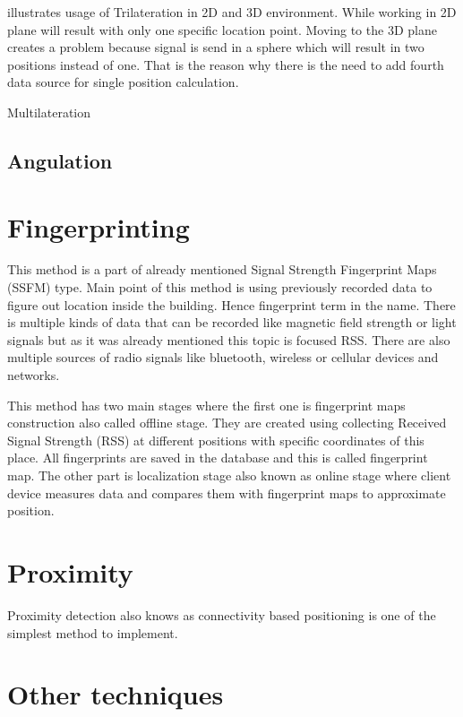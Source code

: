  illustrates usage of Trilateration in 2D and 3D environment. While working in 2D plane will result with only one specific location point. Moving to the 3D plane creates a problem because signal is send in a sphere which will result in two positions instead of one. That is the reason why there is the need to add fourth data source for single position calculation.

Multilateration


\subsection{Angulation}\label{sec:Angulation}

\section{Fingerprinting}\label{sec:Fingerprinting}
This method is a part of already mentioned Signal Strength Fingerprint Maps (SSFM) type. Main point of this method is using previously recorded data to figure out location inside the building. Hence fingerprint term in the name. There is multiple kinds of data that can be recorded like magnetic field strength or light signals but as it was already mentioned this topic is focused RSS. There are also multiple sources of radio signals like bluetooth, wireless or cellular devices and networks.

This method has two main stages where the first one is fingerprint maps construction also called offline stage. They are created using collecting Received Signal Strength (RSS) at different positions with specific coordinates of this place. All fingerprints are saved in the database and this is called fingerprint map. The other part is localization stage also known as online stage where client device measures data and compares them with fingerprint maps to approximate position. \cite{LocalizationApproaches}\cite{IndoorLocalizationWithoutThePain}

\section{Proximity}\label{sec:Proximity}
Proximity detection also knows as connectivity based positioning is one of the simplest method to implement.

\section{Other techniques}


